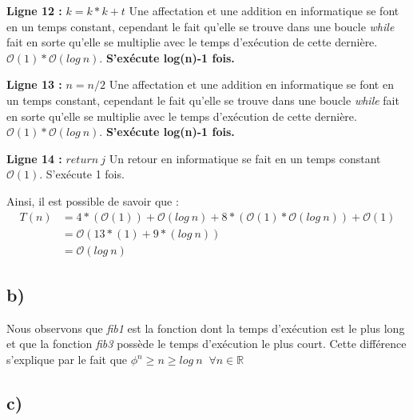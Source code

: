 \documentclass[12pt]{article}
\begin{document}
        \noindent \textbf{Ligne 12 :} \( k = k*k + t \) \newline
  	    Une affectation et une addition en informatique se font en un temps constant, cependant le fait qu'elle se trouve dans une boucle \textit{while} fait en sorte qu'elle se multiplie avec le temps d'exécution de cette dernière.
        \( \mathcal{O}(1)*\mathcal{O}(log \: n) \). \newline
        \textbf{S'exécute log(n)-1 fois.} \newline
       
        \noindent \textbf{Ligne 13 :} \( n = n/2 \) \newline
  	    Une affectation et une addition en informatique se font en un temps constant, cependant le fait qu'elle se trouve dans une boucle \textit{while} fait en sorte qu'elle se multiplie avec le temps d'exécution de cette dernière.
        \( \mathcal{O}(1)*\mathcal{O}(log \: n) \). \newline
        \textbf{S'exécute log(n)-1 fois.} \newline
        
        \noindent \textbf{Ligne 14 :} \( return \: j \) \newline
  	    Un retour en informatique se fait en un temps constant
        \( \mathcal{O}(1) \). \newline
		S'exécute 1 fois. \newline
		
        \noindent Ainsi, il est possible de savoir que : 
	    \begin{align*}
	       T(n) &= 4*(\mathcal{O}(1))+\mathcal{O}(log \: n)+8*( \mathcal{O}(1)*\mathcal{O}(log \: n)) + \mathcal{O}(1) \\
	   	   &= \mathcal{O}(13*(1)+9*(log \: n)) \\
	       &= \mathcal{O}(log \: n)
	    \end{align*}
  	\newpage
    \subsection*{b)}
      \noindent Nous observons que \textit{fib1} est la fonction dont la temps d'exécution est le plus long et que la fonction \textit{fib3} possède le temps d'exécution le plus court. Cette différence s'explique par le fait que \( \phi^n \geq n \geq log \: n  \; \; \forall n \in \mathbb{R} \)  
    \subsection*{c)}
\end{document}
